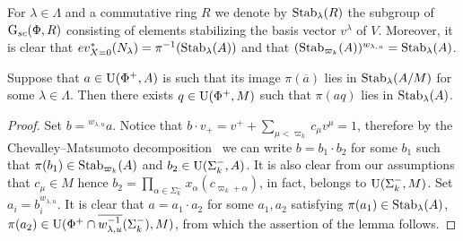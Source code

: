 For $\lambda \in \Lambda$ and a commutative ring $R$ we denote by $\operatorname{Stab}_{\lambda}(R)$ the subgroup of $\operatorname{G}_{sc}(\Phi, R)$
 consisting of elements stabilizing the basis vector $v^\lambda$ of $V$.
Moreover, it is clear that $ev_{X=0}^*(N_\lambda) = \pi^{-1}(\operatorname{Stab}_\lambda(A))$ and that
 $(\operatorname{Stab}_{\varpi_k}(A))^{w_{\lambda, u}} = \operatorname{Stab}_\lambda(A)$.
\begin{lemma} \label{lem:q}
Suppose that $a \in \operatorname{U}(\Phi^+, A)$ is such that its image $\pi(\overline{a})$ lies in $\operatorname{Stab}_{\lambda}(A/M)$ for some $\lambda \in \Lambda$.
Then there exists $q \in \operatorname{U}(\Phi^+, M)$ such that $\pi(aq)$ lies in $\operatorname{Stab}_{\lambda}(A)$.
\end{lemma}
\begin{proof}
    Set $b = {}^{w_{\lambda, u}} a$.
    Notice that $b \cdot v_+ = v^+ + \sum_{\mu < \varpi_k} c_\mu v^\mu = 1$, therefore by the Chevalley--Matsumoto decomposition~\cite[Theorem~1.3]{St78} we can write
     $b = b_1 \cdot b_2$ for some $b_1$ such that $\pi(b_1) \in \operatorname{Stab}_{\varpi_k}(A)$ and $b_2 \in \operatorname{U}(\Sigma_k^-, A)$.
    It is also clear from our assumptions that $c_\mu \in M$ hence $b_2 = \prod_{\alpha \in \Sigma_k^-}x_{\alpha}(c_{\varpi_k + \alpha})$, in fact, belongs to $\operatorname{U}(\Sigma_k^-, M)$.
    Set $a_i = b_i^{w_{\lambda, u}}$.
    It is clear that $a = a_1 \cdot a_2$  for some $a_1, a_2$ satisfying $\pi(a_1) \in \operatorname{Stab}_\lambda(A)$, $\pi(a_2) \in \operatorname{U}(\Phi^+ \cap \overline{w_{\lambda, u}^{-1}}(\Sigma_k^-), M)$,
     from which the assertion of the lemma follows.
\end{proof}

